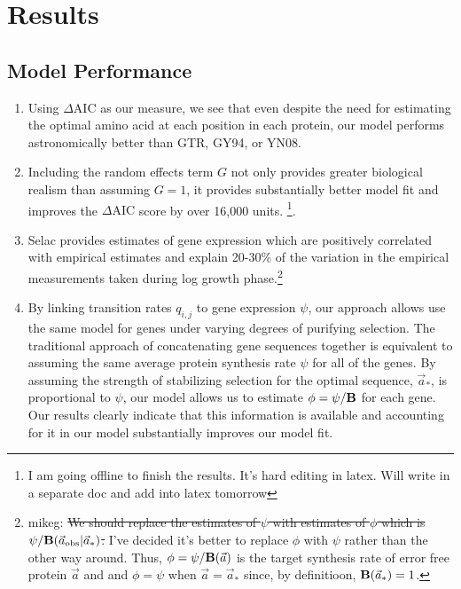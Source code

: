 \documentclass{article}
\newcommand{\DeltaAIC}{\ensuremath{\Delta\text{AIC}}\xspace}
\newcommand{\Funcaobsvec}{\ensuremath{\Func(\aobsvec|\aoptvec)}\xspace}
\newcommand{\Func}{\ensuremath{\text{\textbf{B}}}\xspace}
\newcommand{\aobsvec}{\ensuremath{\Vec{a}_{\text{obs}}}\xspace}
\newcommand{\aoptvec}{\ensuremath{\Vec{a}_*}\xspace}
\newcommand{\avec}{\ensuremath{\Vec{a}}\xspace}
\newcommand{\qij}{\ensuremath{q_{i,j}}\xspace}
\begin{document}
\section*{Results}
\subsection*{Model Performance}
\begin{enumerate}
\item Using \DeltaAIC as our measure, we see that even despite the need for estimating the optimal amino acid at each position in each protein, our model performs astronomically better than GTR, GY94, or YN08.
\item Including the random effects term $G$ not only provides greater biological realism than assuming $G=1$, it provides substantially better model fit and improves the \DeltaAIC score by over 16,000 units.
  \footnote{I am going offline to finish the results. It's hard editing in latex. Will write in a separate doc and add into latex tomorrow}.




\item Selac provides estimates of gene expression which are positively correlated with empirical estimates and explain 20-30\% of the variation in the empirical measurements taken during log growth phase.\footnote{mikeg: \sout{We should replace the estimates of $\psi$ with estimates of $\phi$ which is $\psi/\Funcaobsvec$.}
I've decided it's better to replace $\phi$ with $\psi$ rather than the other way around.
Thus, $\phi = \psi/\Func(\avec)$ is the target synthesis rate of error free protein $\avec$ and and $\phi = \psi$ when  $\avec = \aoptvec$ since, by definitioon, $\Func(\aoptvec) = 1$.
}

\item By linking transition rates $\qij$ to gene expression $\psi$, our approach allows use the same model for genes under varying degrees of purifying selection.
The traditional approach of concatenating gene sequences together is equivalent to assuming the same average protein synthesis rate $\psi$ for all of the genes.
By assuming the strength of stabilizing selection for the optimal sequence, \aoptvec, is proportional to $\psi$,  our model allows us to estimate $\phi = \psi/\Func$ for each gene.
Our results clearly indicate that this information is available and accounting for it in our model substantially improves our model fit.

\end{enumerate}
\end{document}

